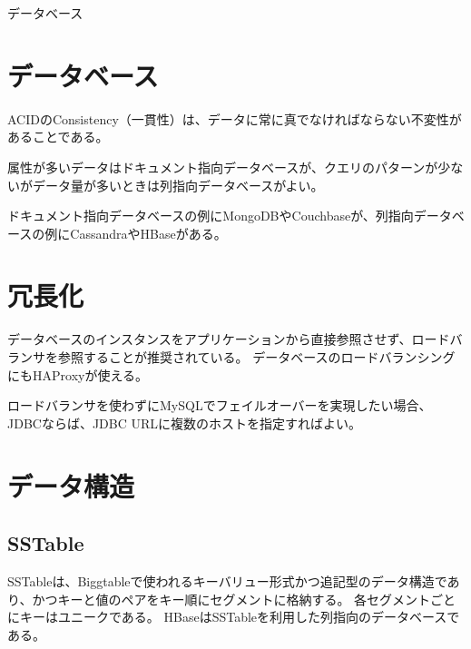 \documentclass[book]{jlreq}
\begin{document}
\begin{chapter-bib}{データベース}
  \section{データベース}
  ACIDのConsistency（一貫性）は、データに常に真でなければならない不変性があることである\cite{ddia}。
  
  属性が多いデータはドキュメント指向データベースが、クエリのパターンが少ないがデータ量が多いときは列指向データベースがよい\cite{lc-databases}。
  
  ドキュメント指向データベースの例にMongoDBやCouchbaseが、列指向データベースの例にCassandraやHBaseがある。
  \section{冗長化}
  データベースのインスタンスをアプリケーションから直接参照させず、ロードバランサを参照することが推奨されている\cite{cs75}。
  データベースのロードバランシングにもHAProxyが使える\cite{haproxyMySQL}。
  
  ロードバランサを使わずにMySQLでフェイルオーバーを実現したい場合、JDBCならば、JDBC URLに複数のホストを指定すればよい\cite{MySQLJDBC}。
  \section{データ構造}
  \subsection{SSTable}
  SSTableは、Biggtableで使われるキーバリュー形式かつ追記型のデータ構造であり、かつキーと値のペアをキー順にセグメントに格納する\cite{ddia}。
  各セグメントごとにキーはユニークである。
  HBaseはSSTableを利用した列指向のデータベースである\cite{ddia}。
\end{chapter-bib}
\end{document}
